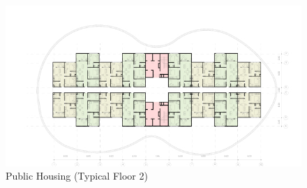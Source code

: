\begin{figure}[H]
	\centering
	\includegraphics[width=\linewidth]{src/graphics/nurture--pub-housing-typical-floor-02.jpg}
	\caption*{%
		Public Housing (Typical Floor 2)
	}
	\label{
		fig:nurture--pub-housing-typical-floor-02
	}
\end{figure}
